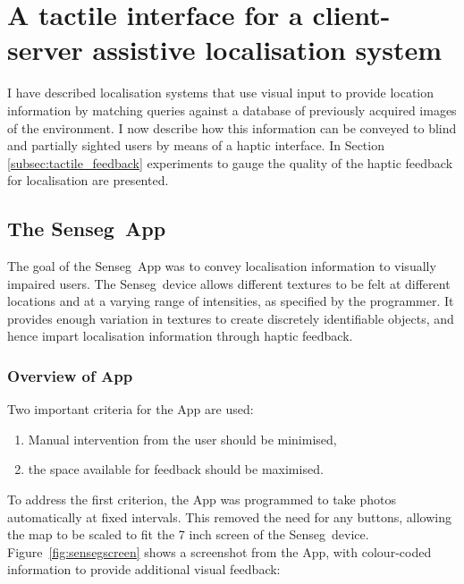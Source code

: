 \section{A tactile interface for a client-server assistive localisation system}
\label{sec:tactile}
I have described localisation systems that use visual input to provide location information by matching queries against a database of previously acquired images of the environment. I now describe how this information can be conveyed to blind and partially sighted users by means of a haptic interface. In Section \ref{subsec:tactile_feedback} experiments to gauge the quality of the haptic feedback for localisation are presented.

\subsection{The Senseg\texttrademark\ App}
The goal of the Senseg\texttrademark\ App was to convey localisation information to visually impaired users. The Senseg\texttrademark\ device allows different textures to be felt at different locations and at a varying range of intensities, as specified by the programmer. It provides enough variation in textures to create discretely identifiable objects, and hence impart localisation information through haptic feedback.

\subsubsection{Overview of App} 
Two important criteria for the App are used: 

\begin{enumerate}
\item Manual intervention from the user should be minimised,
\item the space available for feedback should be maximised. 
\end{enumerate}

To address the first criterion, the App was programmed to take photos automatically at fixed intervals. This removed the need for any buttons, allowing the map to be scaled to fit the 7 inch screen of the Senseg\texttrademark\ device. Figure~\ref{fig:sensegscreen} shows a screenshot from the App, with colour-coded information to provide additional visual feedback:

